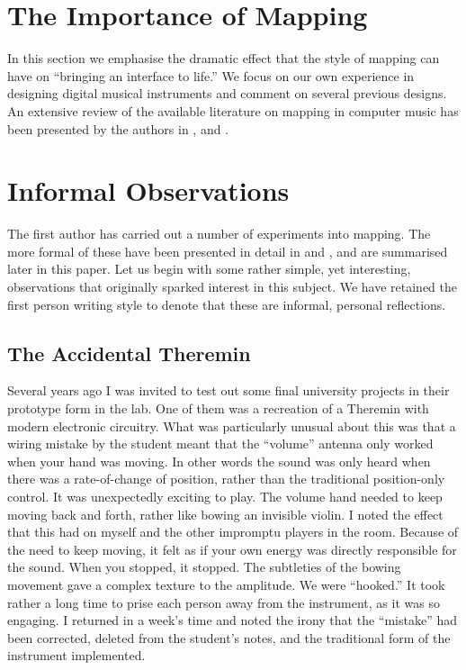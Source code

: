\section{The Importance of Mapping}

In this section we emphasise the dramatic effect that the style of mapping can
have on ``bringing an interface to life.'' We focus on our own experience in
designing digital musical instruments and comment on several previous designs. An
extensive review of the available literature on mapping in computer music has
been presented by the authors in \cite{Hunt:2000b}, \cite{Wanderley:2001} and \cite{Wanderley:2002}.

\section{Informal Observations }

The first author has carried out a number of experiments into mapping.  The more
formal of these have been presented in detail in \cite{Hunt:2000} and \cite{Hunt:1999}, 
and are summarised later in this paper. Let us begin with some rather simple, yet interesting,
observations that originally sparked interest in this subject.  We have retained
the first person writing style to denote that these are informal, personal
reflections.

\subsection{The Accidental Theremin }

Several years ago I was invited to test out some final university projects in
their prototype form in the lab.  One of them was a recreation of a Theremin with
modern electronic circuitry.  What was particularly unusual about this was that a
wiring mistake by the student meant that the ``volume'' antenna only worked when
your hand was moving.  In other words the sound was only heard when there was a
rate-of-change of position, rather than the traditional position-only control. 
It was unexpectedly exciting to play.  The volume hand needed to keep moving back
and forth, rather like bowing an invisible violin.  I noted the effect that this
had on myself and the other impromptu players in the room.  Because of the need
to keep moving, it felt as if your own energy was directly responsible for the
sound.  When you stopped, it stopped.  The subtleties of the bowing movement gave
a complex texture to the amplitude.  We were ``hooked.''  It took rather a long
time to prise each person away from the instrument, as it was so engaging.  I
returned in a week's time and noted the irony that the ``mistake'' had been
corrected, deleted from the student's notes, and the traditional form of the
instrument implemented.

